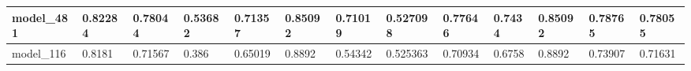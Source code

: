 \begin{tabular}{|l|l|l|l|l|l|l|l|l|l|l|l|l|}
model\_481     & 0.82284     & 0.78044        & 0.53682      & 0.71357          & 0.85092              & 0.71019              & 0.527098     & 0.77646           & 0.7434             & 0.85092         & 0.78765     & 0.78055      \\ \hline
model\_116     & 0.8181      & 0.71567        & 0.386        & 0.65019          & 0.8892               & 0.54342              & 0.525363     & 0.70934           & 0.6758             & 0.8892          & 0.73907     & 0.71631      \\ \hline
\end{tabular}